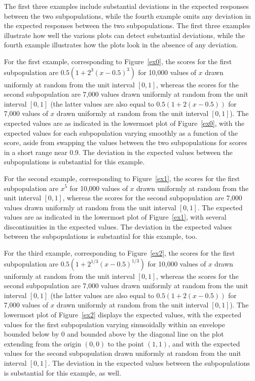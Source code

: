 \documentclass{article}
\begin{document}
The first three examples include substantial deviations
in the expected responses between the two subpopulations,
while the fourth example omits any deviation
in the expected responses between the two subpopulations.
The first three examples illustrate how well the various plots can detect
substantial deviations, while the fourth example illustrates how the plots look
in the absence of any deviation.

For the first example, corresponding to Figure~\ref{ex0},
the scores for the first subpopulation
are $0.5 (1 + 2^3 (x - 0.5)^3)$ for 10,000 values of $x$
drawn uniformly at random from the unit interval $[0, 1]$,
whereas the scores for the second subpopulation are 7,000 values
drawn uniformly at random from the unit interval $[0, 1]$
(the latter values are also equal to $0.5 (1 + 2 (x - 0.5))$
for 7,000 values of $x$ drawn uniformly at random from the unit interval
$[0, 1]$).
The expected values are as indicated in the lowermost plot of Figure~\ref{ex0},
with the expected values for each subpopulation varying smoothly
as a function of the score, aside from swapping the values between
the two subpopulations for scores in a short range near 0.9.
The deviation in the expected values between the subpopulations
is substantial for this example.

For the second example, corresponding to Figure~\ref{ex1},
the scores for the first subpopulation
are $x^5$ for 10,000 values of $x$
drawn uniformly at random from the unit interval $[0, 1]$,
whereas the scores for the second subpopulation are 7,000 values
drawn uniformly at random from the unit interval $[0, 1]$.
The expected values are as indicated in the lowermost plot of Figure~\ref{ex1},
with several discontinuities in the expected values.
The deviation in the expected values between the subpopulations
is substantial for this example, too.

For the third example, corresponding to Figure~\ref{ex2},
the scores for the first subpopulation
are $0.5 (1 + 2^{1/3} (x - 0.5)^{1/3})$ for 10,000 values of $x$
drawn uniformly at random from the unit interval $[0, 1]$,
whereas the scores for the second subpopulation are 7,000 values
drawn uniformly at random from the unit interval $[0, 1]$
(the latter values are also equal to $0.5 (1 + 2 (x - 0.5))$
for 7,000 values of $x$ drawn uniformly at random from the unit interval
$[0, 1]$).
The lowermost plot of Figure~\ref{ex2} displays the expected values,
with the expected values for the first subpopulation varying sinusoidally
within an envelope bounded below by 0 and bounded above by the diagonal line
on the plot extending from the origin $(0, 0)$ to the point $(1, 1)$,
and with the expected values for the second subpopulation drawn uniformly
at random from the unit interval $[0, 1]$.
The deviation in the expected values between the subpopulations
is substantial for this example, as well.
\end{document}
